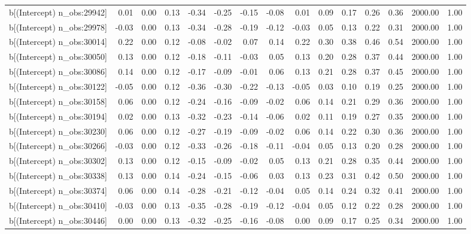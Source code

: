 \begin{table}[ht]
\begin{tabular}{rrrrrrrrrrrrrrr}
  b[(Intercept) n\_obs:29942] & 0.01 & 0.00 & 0.13 & -0.34 & -0.25 & -0.15 & -0.08 & 0.01 & 0.09 & 0.17 & 0.26 & 0.36 & 2000.00 & 1.00 \\ 
  b[(Intercept) n\_obs:29978] & -0.03 & 0.00 & 0.13 & -0.34 & -0.28 & -0.19 & -0.12 & -0.03 & 0.05 & 0.13 & 0.22 & 0.31 & 2000.00 & 1.00 \\ 
  b[(Intercept) n\_obs:30014] & 0.22 & 0.00 & 0.12 & -0.08 & -0.02 & 0.07 & 0.14 & 0.22 & 0.30 & 0.38 & 0.46 & 0.54 & 2000.00 & 1.00 \\ 
  b[(Intercept) n\_obs:30050] & 0.13 & 0.00 & 0.12 & -0.18 & -0.11 & -0.03 & 0.05 & 0.13 & 0.20 & 0.28 & 0.37 & 0.44 & 2000.00 & 1.00 \\ 
  b[(Intercept) n\_obs:30086] & 0.14 & 0.00 & 0.12 & -0.17 & -0.09 & -0.01 & 0.06 & 0.13 & 0.21 & 0.28 & 0.37 & 0.45 & 2000.00 & 1.00 \\ 
  b[(Intercept) n\_obs:30122] & -0.05 & 0.00 & 0.12 & -0.36 & -0.30 & -0.22 & -0.13 & -0.05 & 0.03 & 0.10 & 0.19 & 0.25 & 2000.00 & 1.00 \\ 
  b[(Intercept) n\_obs:30158] & 0.06 & 0.00 & 0.12 & -0.24 & -0.16 & -0.09 & -0.02 & 0.06 & 0.14 & 0.21 & 0.29 & 0.36 & 2000.00 & 1.00 \\ 
  b[(Intercept) n\_obs:30194] & 0.02 & 0.00 & 0.13 & -0.32 & -0.23 & -0.14 & -0.06 & 0.02 & 0.11 & 0.19 & 0.27 & 0.35 & 2000.00 & 1.00 \\ 
  b[(Intercept) n\_obs:30230] & 0.06 & 0.00 & 0.12 & -0.27 & -0.19 & -0.09 & -0.02 & 0.06 & 0.14 & 0.22 & 0.30 & 0.36 & 2000.00 & 1.00 \\ 
  b[(Intercept) n\_obs:30266] & -0.03 & 0.00 & 0.12 & -0.33 & -0.26 & -0.18 & -0.11 & -0.04 & 0.05 & 0.13 & 0.20 & 0.28 & 2000.00 & 1.00 \\ 
  b[(Intercept) n\_obs:30302] & 0.13 & 0.00 & 0.12 & -0.15 & -0.09 & -0.02 & 0.05 & 0.13 & 0.21 & 0.28 & 0.35 & 0.44 & 2000.00 & 1.00 \\ 
  b[(Intercept) n\_obs:30338] & 0.13 & 0.00 & 0.14 & -0.24 & -0.15 & -0.06 & 0.03 & 0.13 & 0.23 & 0.31 & 0.42 & 0.50 & 2000.00 & 1.00 \\ 
  b[(Intercept) n\_obs:30374] & 0.06 & 0.00 & 0.14 & -0.28 & -0.21 & -0.12 & -0.04 & 0.05 & 0.14 & 0.24 & 0.32 & 0.41 & 2000.00 & 1.00 \\ 
  b[(Intercept) n\_obs:30410] & -0.03 & 0.00 & 0.13 & -0.35 & -0.28 & -0.19 & -0.12 & -0.04 & 0.05 & 0.12 & 0.22 & 0.28 & 2000.00 & 1.00 \\ 
  b[(Intercept) n\_obs:30446] & 0.00 & 0.00 & 0.13 & -0.32 & -0.25 & -0.16 & -0.08 & 0.00 & 0.09 & 0.17 & 0.25 & 0.34 & 2000.00 & 1.00 \\ 

\end{tabular}
\end{table}
